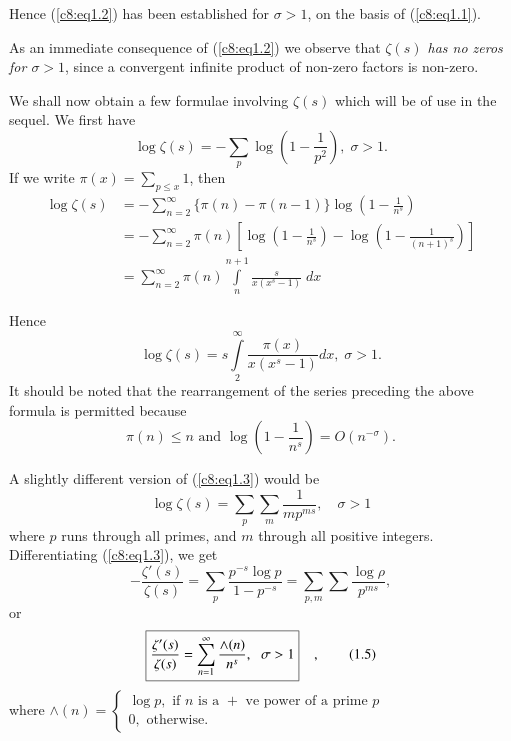 Hence (\ref{c8:eq1.2}) has been established for $\sigma >1$, on the basis of
(\ref{c8:eq1.1}). 

As an immediate consequence of (\ref{c8:eq1.2}) we observe that
\textit{$\zeta(s)$ has no zeros for $\sigma >1$}, since a convergent
infinite product of non-zero factors is non-zero.

We shall now obtain a few formulae involving $\zeta(s)$ which will be
of use in the sequel. We first have 
\begin{equation*}
\log \zeta(s) = - \sum\limits_p \log \left(1-\frac{1}{p^2} \right),
\; \sigma >1. \tag{1.3}\label{c8:eq1.3}
\end{equation*}
If we write $\pi (x) = \sum\limits_{p \leq x } 1$, then 
\begin{align*}
\log \zeta(s) & = -\sum\limits^\infty_{n=2} \{\pi(n) - \pi(n-1)\} \log
\left(1-\frac{1}{n^s} \right)\\
& = - \sum\limits^\infty_{n=2} \pi (n) \left[ \log \left(
  1-\frac{1}{n^s}\right) - \log \left(1-\frac{1}{(n+1)^s}
  \right)\right]  \\
& = \sum\limits^\infty_{n=2} \pi (n) \int\limits^{n+1}_n
\frac{s}{x(x^s-1)} \; dx
\end{align*}\pageoriginale 

Hence
\begin{equation*}
\log \zeta (s) = s \int\limits^\infty_2 \frac{\pi (x)}{x(x^s-1)} dx,
\; \sigma > 1. \tag{1.4}\label{c8:eq1.4}
\end{equation*}
It should be noted that the rearrangement of the series preceding the
above formula is permitted because
$$
\pi(n) \leq n \text{ and } \log \left(1-\frac{1}{n^s} \right) = O
(n^{-\sigma}) .
$$

A slightly different version of (\ref{c8:eq1.3}) would be 
\begin{equation*}
\log \zeta(s) = \sum\limits_p \sum\limits_m \frac{1}{mp^{ms}} , \quad
\sigma >1 \tag*{$(1.3)'$}\label{c8:eq1.3'}
\end{equation*}
where $p$ runs through all primes, and $m$ through all positive
integers. Differentiating (\ref{c8:eq1.3}), we get
$$
-\frac{\zeta'(s)}{\zeta(s)} = \sum\limits_p \frac{p^{-s}\log
  p}{1-p^{-s}} = \sum\limits_{p,m} \sum \frac{\log \rho}{p^{ms}},
$$
or
\begin{equation*}
\text{\fbox{$\dfrac{\zeta'(s)}{\zeta(s)} = \sum\limits^{\infty}_{n=1}
  \dfrac{\wedge(n)}{n^s}$, \; $\sigma >1$} \;\; , }\tag{1.5}\label{c8:eq1.5}
\end{equation*}\pageoriginale 
where $\wedge(n) =
\begin{cases}
\log p, \text{ if $n$ is a $+$ ve power of a prime $p$}\\
0, \text{ otherwise}.
\end{cases}$

